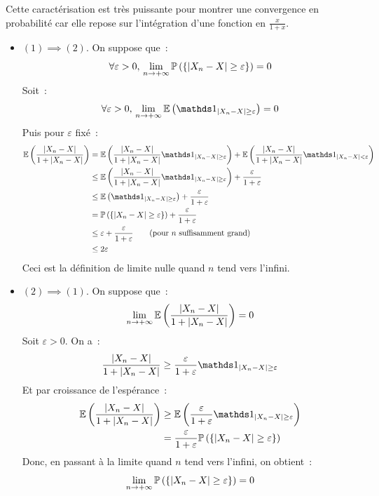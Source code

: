 \begin{remarque}{}{}
    Cette caractérisation est très puissante pour montrer une convergence en probabilité car elle repose sur l'intégration d'une fonction en $\frac{x}{1+x}$.
\end{remarque}

\begin{demonstration}
    \begin{itemize}
        \item $(1) \implies (2)$. On suppose que~:
        $$\forall \varepsilon > 0,\, \lim_{n \to +\infty} \mathbb{P}\left(\left\{\vert X_n - X \vert \geq \varepsilon\right\}\right) = 0$$
        Soit~:
        $$\forall \varepsilon > 0,\, \lim_{n \to +\infty} \esperance{\indicatrice_{\vert X_n - X \vert \geq \varepsilon}} = 0$$
        Puis pour $\varepsilon$ fixé~:
        \begin{align*}
            \esperance{\frac{\vert X_n - X\vert}{1 + \vert X_n - X\vert}} &= \esperance{\frac{\vert X_n - X\vert}{1 + \vert X_n - X\vert} \indicatrice_{\vert X_n - X \vert \geq \varepsilon}} + \esperance{\frac{\vert X_n - X\vert}{1 + \vert X_n - X\vert} \indicatrice_{\vert X_n - X \vert < \varepsilon}}\\
            &\leq \esperance{\frac{\vert X_n - X\vert}{1 + \vert X_n - X\vert} \indicatrice_{\vert X_n - X \vert \geq \varepsilon}} + \frac{\varepsilon}{1+\varepsilon}\\
            &\leq \esperance{\indicatrice_{\vert X_n - X \vert \geq \varepsilon}} + \frac{\varepsilon}{1+\varepsilon}\\
            &= \probaset{\vert X_n - X \vert \geq \varepsilon} + \frac{\varepsilon}{1+\varepsilon}\\
            &\leq \varepsilon + \frac{\varepsilon}{1+\varepsilon} \qquad(\text{pour } n \text{ suffisamment grand})\\
            &\leq 2\varepsilon
        \end{align*}
        Ceci est la définition de limite nulle quand $n$ tend vers l'infini.

        \item $(2) \implies (1)$. On suppose que~:
        $$\lim_{n \to +\infty} \mathbb{E}\left(\frac{\vert X_n - X\vert}{1 + \vert X_n - X\vert}\right) = 0$$
        Soit $\varepsilon > 0$. On a~:
        $$\frac{\vert X_n - X \vert}{1 + \vert X_n - X \vert} \geq \frac{\varepsilon}{1+\varepsilon}\indicatrice_{\vert X_n - X \vert \geq \varepsilon}$$
        Et par croissance de l'espérance~:
        \begin{align*}
            \esperance{\frac{\vert X_n - X\vert}{1 + \vert X_n - X\vert}} &\geq \esperance{\frac{\varepsilon}{1+\varepsilon}\indicatrice_{\vert X_n - X \vert \geq \varepsilon}}\\
            &= \frac{\varepsilon}{1+\varepsilon}\probaset{\vert X_n - X \vert \geq \varepsilon}
        \end{align*}
        Donc, en passant à la limite quand $n$ tend vers l'infini, on obtient~:
        $$\lim_{n \to +\infty} \mathbb{P}\left(\left\{\vert X_n - X \vert \geq \varepsilon\right\}\right) = 0$$
    \end{itemize}

\end{demonstration}

